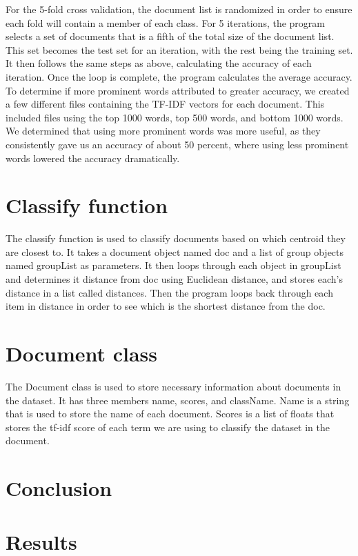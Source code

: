 \documentclass[12pt]{article}
\begin{document}
\indent For the 5-fold cross validation, the document list is randomized in order to ensure each fold will contain a member of each class. For 5 iterations, the program selects a set of documents that is a fifth of the total size of the document list. This set becomes the test set for an iteration, with the rest being the training set. It then follows the same steps as above, calculating the accuracy of each iteration. Once the loop is complete, the program calculates the average accuracy.\\
\indent To determine if more prominent words attributed to greater accuracy, we created a few different files containing the TF-IDF vectors for each document. This included files using the top 1000 words, top 500 words, and bottom 1000 words. We determined that using more prominent words was more useful, as they consistently gave us an accuracy of about 50 percent, where using less prominent words lowered the accuracy dramatically.\\

\section{Classify function}
The classify function is used to classify documents based on which centroid they are closest to. It takes a document object named doc and a list of group objects named groupList as parameters. It then loops through each object in groupList and determines it distance from doc using Euclidean distance, and stores each's distance in a list called distances. Then the program loops back through each item in distance in order to see which is the shortest distance from the doc. 

\section{Document class}
The Document class is used to store necessary information about documents in the dataset. It has three members name, scores,  and className. Name is a string that is used to store the name of each document. Scores is a list of floats that stores the tf-idf score of each term we are using to classify the dataset in the document.

\section{Conclusion}

\section{Results}


\begin{thebibliography}{9}


\end{thebibliography}
\end{document}
